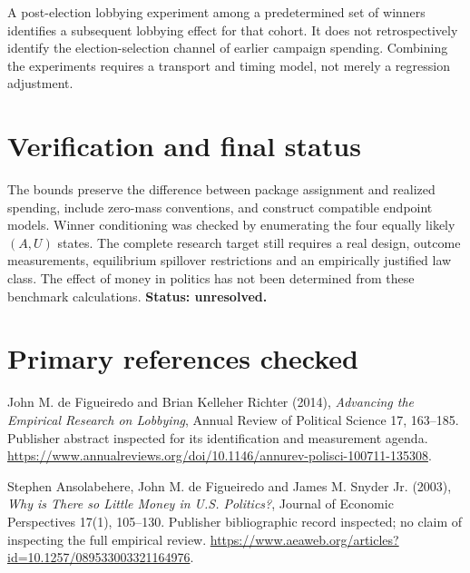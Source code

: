 \documentclass[11pt]{article}
\begin{document}
A post-election lobbying experiment among a predetermined set of winners identifies a subsequent lobbying effect for that cohort. It does not retrospectively identify the election-selection channel of earlier campaign spending. Combining the experiments requires a transport and timing model, not merely a regression adjustment.

\section*{Verification and final status}
The bounds preserve the difference between package assignment and realized spending, include zero-mass conventions, and construct compatible endpoint models. Winner conditioning was checked by enumerating the four equally likely $(A,U)$ states. The complete research target still requires a real design, outcome measurements, equilibrium spillover restrictions and an empirically justified law class. The effect of money in politics has not been determined from these benchmark calculations. \textbf{Status: unresolved.}

\section*{Primary references checked}
John M. de Figueiredo and Brian Kelleher Richter (2014), \emph{Advancing the Empirical Research on Lobbying}, Annual Review of Political Science 17, 163--185. Publisher abstract inspected for its identification and measurement agenda. \url{https://www.annualreviews.org/doi/10.1146/annurev-polisci-100711-135308}.

Stephen Ansolabehere, John M. de Figueiredo and James M. Snyder Jr. (2003), \emph{Why is There so Little Money in U.S. Politics?}, Journal of Economic Perspectives 17(1), 105--130. Publisher bibliographic record inspected; no claim of inspecting the full empirical review. \url{https://www.aeaweb.org/articles?id=10.1257/089533003321164976}.
\end{document}
